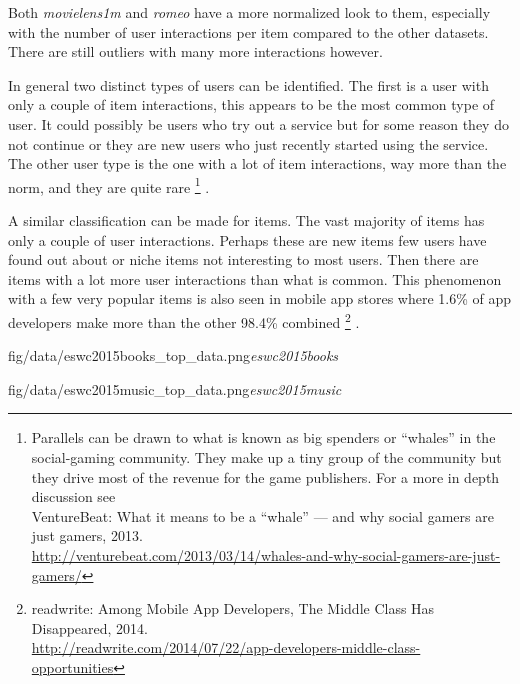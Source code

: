 

Both \textit{movielens1m} and \textit{romeo} have a more normalized look to them, especially with the number of user interactions per item compared to the other datasets. There are still outliers with many more interactions however.

\FloatBarrier

In general two distinct types of users can be identified. The first is a user with only a couple of item interactions, this appears to be the most common type of user. It could possibly be users who try out a service but for some reason they do not continue or they are new users who just recently started using the service. The other user type is the one with a lot of item interactions, way more than the norm, and they are quite rare
\footnote{Parallels can be drawn to what is known as big spenders or ``whales'' in the social-gaming community. They make up a tiny group of the community but they drive most of the revenue for the game publishers. For a more in depth discussion see \\
VentureBeat: What it means to be a ``whale'' — and why social gamers are just gamers, 2013. \\
\url{http://venturebeat.com/2013/03/14/whales-and-why-social-gamers-are-just-gamers/} }
.

A similar classification can be made for items. The vast majority of items has only a couple of user interactions. Perhaps these are new items few users have found out about or niche items not interesting to most users. Then there are items with a lot more user interactions than what is common. This phenomenon with a few very popular items is also seen in mobile app stores where 1.6\% of app developers make more than the other 98.4\% combined
\footnote{
readwrite: Among Mobile App Developers, The Middle Class Has Disappeared, 2014. \\
\url{http://readwrite.com/2014/07/22/app-developers-middle-class-opportunities}
}
.

{fig/data/eswc2015books_top_data.png}{\textit{eswc2015books}}

{fig/data/eswc2015music_top_data.png}{\textit{eswc2015music}}


